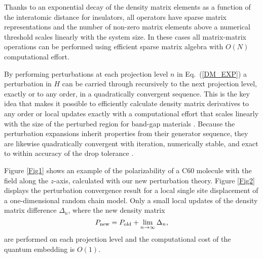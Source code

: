 Thanks to an exponential decay of the density matrix elements
as a function of the interatomic distance for insulators, all operators
have sparse matrix representations and the number of non-zero 
matrix elements above a numerical threshold scales linearly
with the system size. In these cases all matrix-matrix 
operations can be performed using efficient sparse matrix
algebra with $O(N)$ computational effort.

By performing perturbations at each projection level $n$ in Eq.\ (\ref{DM_EXP})
a perturbation in $H$ can be carried through recursively to the next projection 
level, exactly or to any order, in a quadratically convergent 
sequence. This is the key idea that makes it possible to
efficiently calculate density matrix derivatives to any order
or local updates exactly with a computational effort that scales linearly 
with the size of the perturbed region for band-gap materials \cite{NiklassonPRT}.
Because the perturbation expansions inherit properties from their 
generator sequence, they are likewise quadratically convergent with 
iteration, numerically stable, and exact to within accuracy 
of the drop tolerance \cite{NiklassonSP4}.

Figure \ref{Fig1} shows an example of the polarizability of a C60 molecule
with the field along the $z$-axis, calculated with our new perturbation
theory. Figure \ref{Fig2} displays the perturbation
convergence result for a local single site displacement of
a one-dimensional random chain model.  Only a small local updates 
of the density matrix difference $\Delta_n$, where the new density matrix
\begin{equation}
P_{\rm new} = P_{\rm old} + \lim_{n \rightarrow \infty} \Delta_n,
\end{equation}
are performed on each projection level and the computational cost
of the quantum embedding is $O(1)$.

